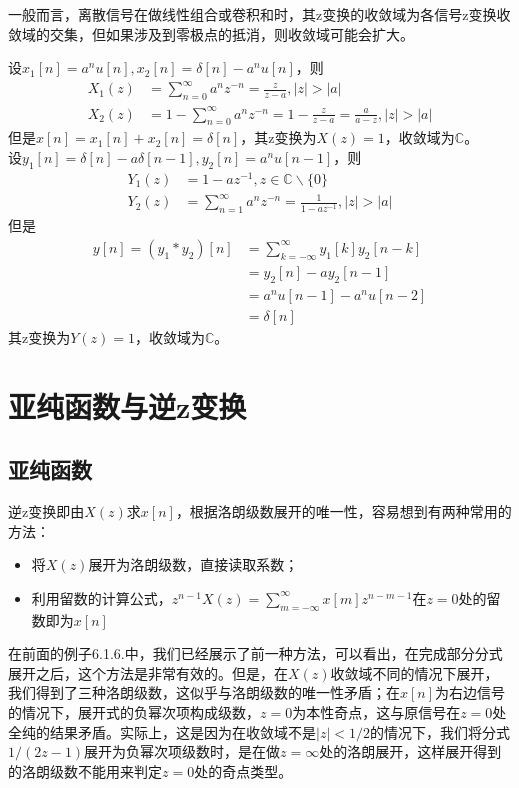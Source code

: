 \documentclass{ctexbook}
\begin{document}
一般而言，离散信号在做线性组合或卷积和时，其z变换的收敛域为各信号z变换收敛域的交集，但如果涉及到零极点的抵消，则收敛域可能会扩大。
\begin{example}[收敛域的扩张]
    设$x_1[n]=a^{n}u[n],x_2[n]=\delta[n]-a^{n}u[n]$，则
    \begin{align*}
        X_1(z)&=\sum_{n=0}^{\infty}a^{n}z^{-n}=\frac{z}{z-a},|z|>|a|\\
        X_2(z)&=1-\sum_{n=0}^{\infty}a^{n}z^{-n}=1-\frac{z}{z-a}=\frac{a}{a-z},|z|>|a|
    \end{align*}
    但是$x[n]=x_1[n]+x_2[n]=\delta[n]$，其z变换为$X(z)=1$，收敛域为$\mathbb{C}$。\\
    设$y_1[n]=\delta[n]-a\delta[n-1],y_2[n]=a^{n}u[n-1]$，则
    \begin{align*}
        Y_1(z)&=1-a z^{-1},z\in\mathbb{C}\backslash\{0\}\\
        Y_2(z)&=\sum_{n=1}^{\infty}a^{n}z^{-n}=\frac{1}{1-a z^{-1}},|z|>|a|
    \end{align*}
    但是\begin{align*}
        y[n]=\left(y_1*y_2\right)[n]&=\sum_{k=-\infty}^{\infty}y_1[k]y_2[n-k]\\
        &=y_2[n]-a y_2[n-1]\\
        &=a^{n}u[n-1]-a^{n}u[n-2]\\
        &=\delta[n]
    \end{align*}
    其z变换为$Y(z)=1$，收敛域为$\mathbb{C}$。
\end{example}

\section{亚纯函数与逆z变换}\label{sec:Inverse_z_Transform}

\subsection{亚纯函数}\label{sub:meromorphic_function}
逆z变换即由$X(z)$求$x[n]$，根据洛朗级数展开的唯一性，容易想到有两种常用的方法：
\begin{itemize}
    \item 将$X(z)$展开为洛朗级数，直接读取系数；
    \item 利用留数的计算公式，$z^{n-1} X(z)=\sum_{m=-\infty}^{\infty} x[m] z^{n-m-1}$在$z=0$处的留数即为$x[n]$
\end{itemize}

在前面的例子6.1.6.中，我们已经展示了前一种方法，可以看出，在完成部分分式展开之后，这个方法是非常有效的。但是，在$X(z)$收敛域不同的情况下展开，我们得到了三种洛朗级数，这似乎与洛朗级数的唯一性矛盾；在$x[n]$为右边信号的情况下，展开式的负幂次项构成级数，$z=0$为本性奇点，这与原信号在$z=0$处全纯的结果矛盾。实际上，这是因为在收敛域不是$|z|<1/2$的情况下，我们将分式$1/(2z-1)$展开为负幂次项级数时，是在做$z=\infty$处的洛朗展开，这样展开得到的洛朗级数不能用来判定$z=0$处的奇点类型。
\end{document}
